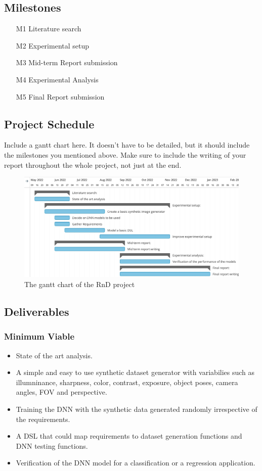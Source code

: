 \documentclass[rnd]{mas_proposal}
\begin{document}
\subsection{Milestones}
\begin{enumerate}
    \item[M1] Literature search
    \item[M2] Experimental setup
    \item[M3] Mid-term Report submission
    \item[M4] Experimental Analysis
    \item[M5] Final Report submission
\end{enumerate}

\subsection{Project Schedule}
Include a gantt chart here. It doesn't have to be detailed, but it should include the milestones you mentioned above.
Make sure to include the writing of your report throughout the whole project, not just at the end.
    
\begin{figure}[h!]
    \centering
    \includegraphics[width=\textwidth]{images/gantt.jpeg}
    \caption{The gantt chart of the RnD project}
    \label{fig:gantt_chart}
\end{figure}

\subsection{Deliverables}
\subsubsection*{Minimum Viable}

\begin{itemize}
    \item State of the art analysis.
    \item A simple and easy to use synthetic dataset generator with variabilies such as illumninance, sharpness, color, contrast, exposure, object poses, camera angles, FOV and perspective.
    \item Training the DNN with the synthetic data generated randomly irrespective of the requirements.
    \item A DSL that could map requirements to dataset generation functions and DNN testing functions.
    \item Verification of the DNN model for a classification or a regression application.
\end{itemize}
\end{document}
